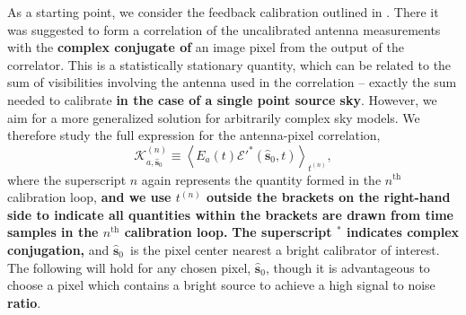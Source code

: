 \documentclass[a4paper,fleqn,usenatbib]{../mnras}
\newcommand{\spix}{\ensuremath{\hat{\mathbf{s}}_{0}}}
\newcommand{\Kna}[1][n]{\ensuremath{\mathcal{K}^{(#1)}_{a,\spix}}}
\begin{document}
As a starting point, we consider the feedback calibration outlined in \citealt{mor11}. There it 
was suggested to form a correlation of the uncalibrated antenna measurements with the \textbf{complex conjugate of} an image 
pixel from the output of the correlator. This is a statistically stationary quantity, which can be 
related to the sum of visibilities involving the antenna used in the correlation -- exactly the sum 
needed to calibrate \textbf{in the case of a single point source sky}. However, we aim for a more 
generalized solution for arbitrarily complex sky models. We therefore study the full expression 
for the antenna-pixel correlation,
\begin{equation}\label{eq:Kna_def}
\Kna \equiv \left<E_a(t) \mathcal{E}'^*(\spix,t)\right>_{t^{(n)}},
\end{equation}
where the superscript $n$ again represents the quantity formed in the $n^\mathrm{th}$ 
calibration loop,
\textbf{and we use $t^{(n)}$ outside the brackets on the right-hand side to indicate all quantities
within the brackets are drawn from time samples in the $n^\mathrm{th}$ calibration loop.}
\textbf{The superscript $^*$ indicates complex conjugation,}
and \spix\, is the pixel center nearest a bright calibrator of interest. The 
following will hold for any chosen pixel, \spix, though it is advantageous to choose a pixel which 
contains a bright source to achieve a high signal to noise \textbf{ratio}. 
\end{document}
